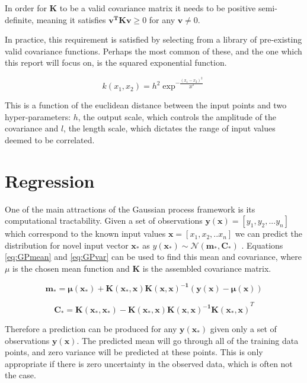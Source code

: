 \documentclass[a4paper,11pt]{report}
\begin{document}
In order for \(\mathbf{K}\) to be a valid covariance matrix it needs to be positive semi-definite, meaning it satisfies \( \mathbf{v^{T} K v} \geq 0\) for any \( \mathbf{v} \neq 0 \).

In practice, this requirement is satisfied by selecting from a library of pre-existing valid covariance functions. Perhaps the most common of these, and the one which this report will focus on, is the squared exponential function.

\begin{equation}
k(x_1,x_2) = h^2 \exp^{- \frac{(x_1-x_2)^2}{2 l^2}}
\end{equation} 

This is a function of the euclidean distance between the input points and two hyper-parameters: \(h\), the output scale, which controls the amplitude of the covariance and \(l\), the length scale, which dictates the range of input values deemed to be correlated. 

\section{Regression}

One of the main attractions of the Gaussian process framework is its computational tractability. Given a set of observations \( \mathbf{y}( \mathbf{x} ) = [y_1, y_2, ... y_n] \) which correspond to the known input values \( \mathbf{x} = [x_1, x_2, .. x_n] \) we can predict the distribution for novel input vector \( \mathbf{x_*} \) as \( y( \mathbf{x_*}) \sim \mathcal{N}(\mathbf{m_*,C_*}) \) \cite{GP-robots}. Equations \ref{eq:GPmean} and \ref{eq:GPvar} can be used to find this mean and covariance, where \(\mu\) is the chosen mean function and \(\mathbf{K}\) is the assembled covariance matrix.

\singlespacing

\begin{equation} \label{eq:GPmean}
\mathbf{m_* = \mu (x_*) + K(x_* ,x) K(x,x)^{-1} (y(x) - \mu (x))}
\end{equation}

\begin{equation} \label{eq:GPvar}
\mathbf{C_* = K(x_*,x_*)-K(x_*,x) K(x,x)^{-1} K(x_*,x)}^{T}
\end{equation}

\doublespacing

Therefore a prediction can be produced for any \(\mathbf{y(x_*)}\) given only a set of observations \(\mathbf{y(x)}\). The predicted mean will go through all of the training data points, and zero variance will be predicted at these points. This is only appropriate if there is zero uncertainty in the observed data, which is often not the case.
\end{document}
